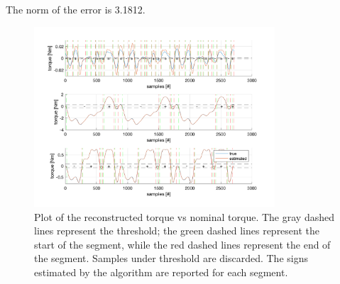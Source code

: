 \documentclass{article}
\begin{document}
The norm of the error is 3.1812.

\begin{figure}[!htbp]
\centering
\includegraphics[width=0.8\textwidth]{images/3-dof/results_experiment4.png}
\caption{Plot of the reconstructed torque vs nominal torque. The gray dashed lines represent the threshold; the green dashed lines represent the start of the segment, while the red dashed lines represent the end of the segment. Samples under threshold are discarded. The signs estimated by the algorithm are reported for each segment.}
\end{figure}
\FloatBarrier
\end{document}
